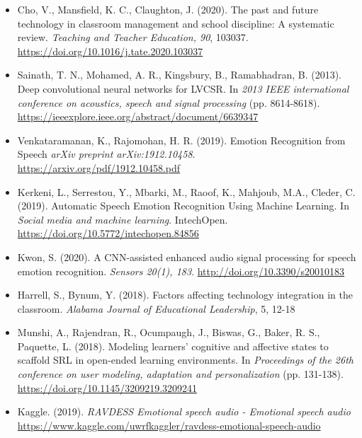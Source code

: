 \documentclass[12pt]{article}
\begin{document}
\begin{itemize}
\item Cho, V., Mansfield, K. C., Claughton, J. (2020). The past and future technology in classroom management and school discipline: A systematic review. \textit{Teaching and Teacher Education, 90}, 103037. \href{https://doi.org/10.1016/j.tate.2020.103037}{https://doi.org/10.1016/j.tate.2020.103037}

\item Sainath, T. N., Mohamed, A. R., Kingsbury, B., Ramabhadran, B. (2013). Deep convolutional neural networks for LVCSR. In \textit{2013 IEEE international conference on acoustics, speech and signal processing} (pp. 8614-8618). \tab \href{https://ieeexplore.ieee.org/abstract/document/6639347}{https://ieeexplore.ieee.org/abstract/document/6639347}

\item Venkataramanan, K., Rajomohan, H. R. (2019). Emotion Recognition from Speech \textit{arXiv preprint arXiv:1912.10458}. \href{https://arxiv.org/pdf/1912.10458.pdf}{https://arxiv.org/pdf/1912.10458.pdf}

\item Kerkeni, L., Serrestou, Y., Mbarki, M., Raoof, K., Mahjoub, M.A., Cleder, C. (2019). Automatic Speech Emotion Recognition Using Machine Learning. In \textit{Social media and machine learning}. IntechOpen. \href{https://doi.org/10.5772/intechopen.84856}{https://doi.org/10.5772/intechopen.84856}

\item Kwon, S. (2020). A CNN-assisted enhanced audio signal processing for speech emotion recognition. \textit{Sensors 20(1), 183}. \href{http://doi.org/10.3390/s20010183}{http://doi.org/10.3390/s20010183}

\item Harrell, S., Bynum, Y. (2018). Factors affecting technology integration in the classroom. \textit{Alabama Journal of Educational Leadership}, 5, 12-18

\item Munshi, A., Rajendran, R., Ocumpaugh, J., Biswas, G., Baker, R. S., Paquette, L. (2018). Modeling learners' cognitive and affective states to scaffold SRL in open-ended learning environments. In \textit{Proceedings of the 26th conference on user modeling, adaptation and personalization} (pp. 131-138). \tab \href{https://doi.org/10.1145/3209219.3209241}{https://doi.org/10.1145/3209219.3209241}

\item Kaggle. (2019). \textit{RAVDESS Emotional speech audio - Emotional speech audio}\\\href{https://www.kaggle.com/uwrfkaggler/ravdess-emotional-speech-audio}{https://www.kaggle.com/uwrfkaggler/ravdess-emotional-speech-audio}
\end{itemize}

\newpage
\end{document}
